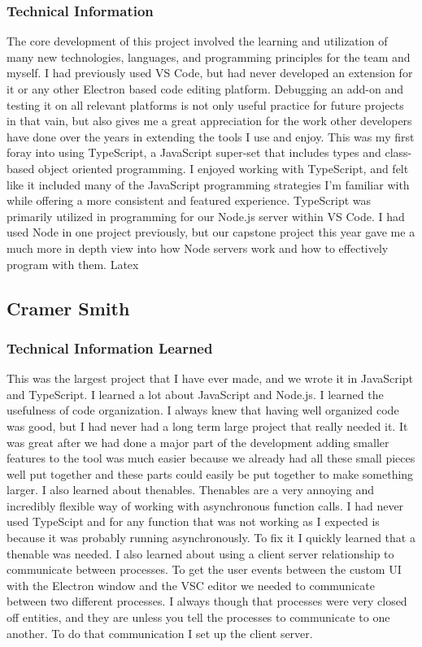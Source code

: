 \documentclass[letterpaper,10pt,titlepage,draftclsnofoot,onecolumn,onesided] {IEEEtran}
\begin{document}
\subsubsection{Technical Information}
The core development of this project involved the learning and utilization of many new technologies, languages, and programming principles for the team and myself.
I had previously used VS Code, but had never developed an extension for it or any other Electron based code editing platform.
Debugging an add-on and testing it on all relevant platforms is not only useful practice for future projects in that vain, but also gives me a great appreciation for the work other developers have done over the years in extending the tools I use and enjoy.
This was my first foray into using TypeScript, a JavaScript super-set that includes types and class-based object oriented programming. I enjoyed working with TypeScript, and felt like it included many of the JavaScript programming strategies I'm familiar with while offering a more consistent and featured experience.
TypeScript was primarily utilized in programming for our Node.js server within VS Code.
I had used Node in one project previously, but our capstone project this year gave me a much more in depth view into how Node servers work and how to effectively program with them.
Latex
\subsection{Cramer Smith}

\subsubsection{Technical Information Learned}

This was the largest project that I have ever made, and we wrote it in JavaScript and TypeScript. 
I learned a lot about JavaScript and Node.js.
I learned the usefulness of code organization. 
I always knew that having well organized code was good, but I had never had a long term large project that really needed it.
It was great after we had done a major part of the development adding smaller features to the tool was much easier because we already had all these small pieces well put together and these parts could easily be put together to make something larger.
I also learned about thenables. 
Thenables are a very annoying and incredibly flexible way of working with asynchronous function calls.
I had never used TypeScipt and for any function that was not working as I expected is because it was probably running asynchronously. 
To fix it I quickly learned that a thenable was needed.
I also learned about using a client server relationship to communicate between processes.
To get the user events between the custom UI with the Electron window and the VSC editor we needed to communicate between two different processes. 
I always though that processes were very closed off entities, and they are unless you tell the processes to communicate to one another. 
To do that communication I set up the client server.
\end{document}

